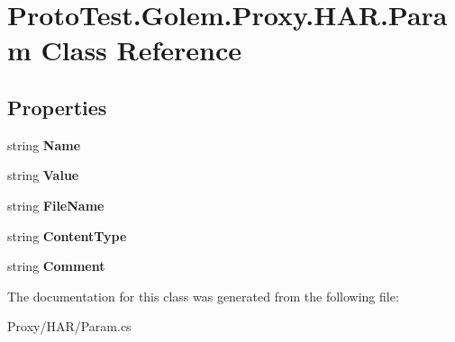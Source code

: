 \hypertarget{class_proto_test_1_1_golem_1_1_proxy_1_1_h_a_r_1_1_param}{\section{Proto\-Test.\-Golem.\-Proxy.\-H\-A\-R.\-Param Class Reference}
\label{class_proto_test_1_1_golem_1_1_proxy_1_1_h_a_r_1_1_param}
}
\subsection*{Properties}
\begin{DoxyCompactItemize}
\item 
\hypertarget{class_proto_test_1_1_golem_1_1_proxy_1_1_h_a_r_1_1_param_a5ca66364b8b91caf293b961c114c51f3}{string {\bfseries Name}}\label{class_proto_test_1_1_golem_1_1_proxy_1_1_h_a_r_1_1_param_a5ca66364b8b91caf293b961c114c51f3}

\item 
\hypertarget{class_proto_test_1_1_golem_1_1_proxy_1_1_h_a_r_1_1_param_a61c06ec5c99e77f8fa417cc846c5e706}{string {\bfseries Value}}\label{class_proto_test_1_1_golem_1_1_proxy_1_1_h_a_r_1_1_param_a61c06ec5c99e77f8fa417cc846c5e706}

\item 
\hypertarget{class_proto_test_1_1_golem_1_1_proxy_1_1_h_a_r_1_1_param_a33bffebfb37cdcf7b5587ff9b4ca124c}{string {\bfseries File\-Name}}\label{class_proto_test_1_1_golem_1_1_proxy_1_1_h_a_r_1_1_param_a33bffebfb37cdcf7b5587ff9b4ca124c}

\item 
\hypertarget{class_proto_test_1_1_golem_1_1_proxy_1_1_h_a_r_1_1_param_a4880aa2f329a99201f82311719469150}{string {\bfseries Content\-Type}}\label{class_proto_test_1_1_golem_1_1_proxy_1_1_h_a_r_1_1_param_a4880aa2f329a99201f82311719469150}

\item 
\hypertarget{class_proto_test_1_1_golem_1_1_proxy_1_1_h_a_r_1_1_param_a97e4b53685de18b25c03f9454865abcd}{string {\bfseries Comment}}\label{class_proto_test_1_1_golem_1_1_proxy_1_1_h_a_r_1_1_param_a97e4b53685de18b25c03f9454865abcd}

\end{DoxyCompactItemize}


The documentation for this class was generated from the following file\-:\begin{DoxyCompactItemize}
\item 
Proxy/\-H\-A\-R/Param.\-cs\end{DoxyCompactItemize}
